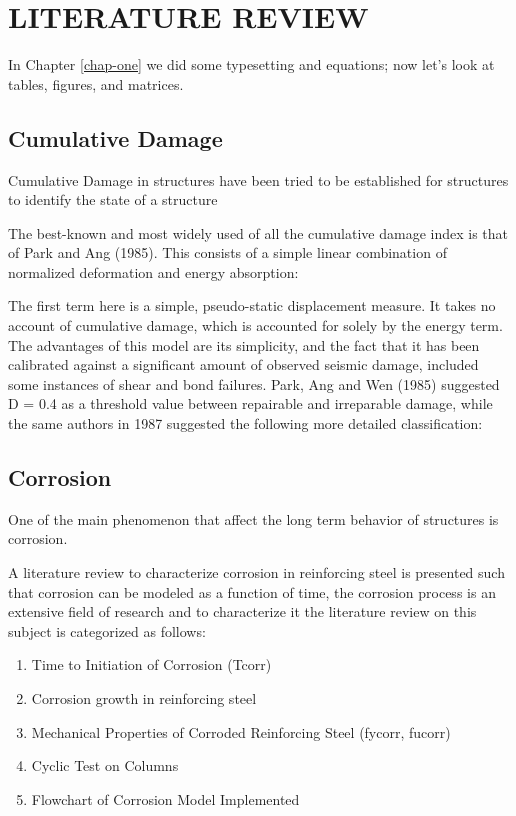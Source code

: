 \chapter{LITERATURE REVIEW}
\label{chap-two}
In Chapter \ref{chap-one} we did some typesetting and equations; now let's 
look at tables, figures, and matrices.

\section{Cumulative Damage}

Cumulative Damage in structures have been tried to be established for structures to identify the state of a structure 

The best-known and most widely used of all the cumulative damage index is that of Park and Ang (1985). This consists of a simple linear combination of normalized deformation and energy absorption: 

The first term here is a simple, pseudo-static displacement measure. It takes no account of cumulative damage, which is accounted for solely by the energy term. The advantages of this model are its simplicity, and the fact that it has been calibrated against a significant amount of observed seismic damage, included some instances of shear and bond failures. Park, Ang and Wen (1985) suggested D = 0.4 as a threshold value between repairable and irreparable damage, while the same authors in 1987 suggested the following more detailed classification: 

\section{Corrosion}

One of the main phenomenon that affect the long term behavior of structures is corrosion. 

A literature review to characterize corrosion in reinforcing steel is presented such that corrosion can be modeled as a function of time, the corrosion process is an extensive field of research and to characterize it  the literature review on this subject is categorized as follows:

\begin{enumerate}
	\item Time to Initiation of Corrosion (Tcorr)
	\item Corrosion growth in reinforcing steel
	\item Mechanical Properties of Corroded Reinforcing Steel (fycorr, fucorr)
	\item Cyclic Test on Columns
	\item Flowchart of Corrosion Model Implemented
\end{enumerate}

